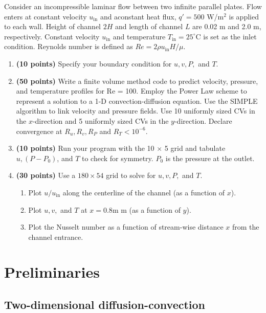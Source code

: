 \documentclass{article}
\begin{document}
Consider an incompressible laminar flow between two infinite parallel plates. Flow enters at constant velocity $u_\mathrm{in}$ and aconstant heat flux, $q' = 500$ W/m$^2$ is applied to each wall. Height of channel $2H$ and length of channel $L$ are 0.02 m and 2.0 m, respectively. Constant velocity $u_\mathrm{in}$ and temperature $T_\mathrm{in} = 25^\circ$C is set as the inlet condition. Reynolds number is defined as $Re = 2 \rho u_\mathrm{in} H / \mu$.
\begin{enumerate}
	\item \textbf{(10 points)} Specify your boundary condition for $u, v, P,$ and $T$.
	\item \textbf{(50 points)} Write a finite volume method code to predict velocity, pressure, and temperature profiles for Re = 100. Employ the Power Law scheme to represent a solution to a 1-D convection-diffusion equation. Use the SIMPLE algorithm to link velocity and pressure fields. Use 10 uniformly sized CVs in the $x$-direction and 5 uniformly sized CVs in the $y$-direction. Declare convergence at $R_u, R_v, R_P$ and $R_T < 10^{-6}$. 
	\item \textbf{(10 points)} Run your program with the 10 $\times$ 5 grid and tabulate $u, (P - P_0)$, and $T$ to check for symmetry. $P_0$ is the pressure at the outlet.
	\item \textbf{(30 points)} Use a $180 \times 54$ grid to solve for $u, v, P,$ and $T$.
	\begin{enumerate}[label=(\alph*)]
		\item Plot $u/u_\mathrm{in}$ along the centerline of the channel (as a function of $x$).
		\item Plot $u, v,$ and $T$ at $x = 0.8$m m (as a function of $y$).
		\item Plot the Nusselt number as a function of stream-wise distance $x$ from the channel entrance.
	\end{enumerate}
\end{enumerate}

\section{Preliminaries}

\subsection{Two-dimensional diffusion-convection}
\end{document}
